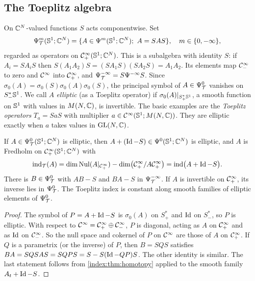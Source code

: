 \subsection{The Toeplitz algebra}
On $\mathbb{C}^N$-valued functions $S$ acts componentwise. Set
\begin{equation*}
  \Psi^{m}_{\mathcal T}(\mathbb{S}^1;\mathbb{C}^N)=\{A\in\Psi^{m}(\mathbb{S}^1;\mathbb{C}^N);\ A=SAS\},\quad
  m\in\{0,-\infty\},
\end{equation*}
regarded as operators on $\mathcal{C}^\infty_{+}(\mathbb{S}^1;\mathbb{C}^N)$. This is a subalgebra with
identity $S$: if $A_i=SA_iS$ then
$S(A_1A_2)S=(SA_1S)(SA_2S)=A_1A_2$. Its elements map $\mathcal{C}^\infty_{-}$ to zero and
$\mathcal{C}^\infty$ into $\mathcal{C}^\infty_{+}$, and $\Psi^{-\infty}_{\mathcal T}=S\Psi^{-\infty}S$. Since
$\sigma_0(A)=\sigma_0(S)\sigma_0(A)\sigma_0(S)$, the principal symbol of
$A\in\Psi^{0}_{\mathcal T}$ vanishes on $S^*_-\mathbb{S}^1$. We call $A$ \emph{elliptic} (as a
Toeplitz operator) if $\sigma_0(A)|_{S^*_+\mathbb{S}^1}$, a smooth function on
$\mathbb{S}^1$ with values in $M(N,\mathbb{C})$, is invertible. The basic examples are the
\emph{Toeplitz operators} $T_a=SaS$ with multiplier
$a\in\mathcal{C}^\infty(\mathbb{S}^1;M(N,\mathbb{C}))$. They are elliptic exactly when $a$ takes values
in $\operatorname{GL}(N,\mathbb{C})$.

\begin{proposition}\label{index:prop:toeplitz-fredholm}
  If $A\in\Psi^{0}_{\mathcal T}(\mathbb{S}^1;\mathbb{C}^N)$ is elliptic, then $A+(\operatorname{Id}-S)\in\Psi^{0}
  (\mathbb{S}^1;\mathbb{C}^N)$ is elliptic, and $A$ is Fredholm on
  $\mathcal{C}^\infty_{+}(\mathbb{S}^1;\mathbb{C}^N)$ with
  \begin{equation*}
    \operatorname{ind}_{\mathcal T}(A)=\dim\operatorname{Nul}(A|_{\mathcal{C}^\infty_{+}})-\dim\bigl(\mathcal{C}^\infty_{+}/A\mathcal{C}^\infty_{+}\bigr)
    =\operatorname{ind}\bigl(A+\operatorname{Id}-S\bigr).
  \end{equation*}
  There is $B\in\Psi^{0}_{\mathcal T}$ with $AB-S$ and $BA-S$ in $\Psi^{-\infty}_{\mathcal T}$. If $A$ is
  invertible on $\mathcal{C}^\infty_{+}$, its inverse lies in $\Psi^{0}_{\mathcal T}$. The Toeplitz index
  is constant along smooth families of elliptic elements of $\Psi^{0}_{\mathcal T}$.
\end{proposition}
\begin{proof}
  The symbol of $P=A+\operatorname{Id}-S$ is $\sigma_0(A)$ on $S^*_+$ and $\operatorname{Id}$ on $S^*_-$,
  so $P$ is elliptic. With respect to $\mathcal{C}^\infty=\mathcal{C}^\infty_{+}\oplus\mathcal{C}^\infty_{-}$, $P$ is
  diagonal, acting as $A$ on $\mathcal{C}^\infty_{+}$ and as $\operatorname{Id}$ on $\mathcal{C}^\infty_{-}$. So the null
  space and cokernel of $P$ on $\mathcal{C}^\infty$ are those of $A$ on $\mathcal{C}^\infty_{+}$. If $Q$ is a
  parametrix (or the inverse) of $P$, then $B=SQS$ satisfies
  $BA=SQSAS=SQPS=S-S(\operatorname{Id}-QP)S$. The other identity is similar. The last
  statement follows from \cref{index:thm:homotopy} applied to the smooth
  family $A_t+\operatorname{Id}-S$.
\end{proof}

